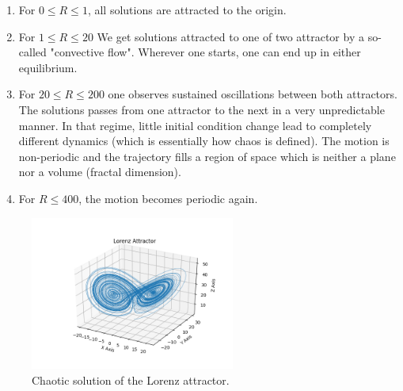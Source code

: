 \begin{enumerate}
    \item For $0\leq R \leq 1$, all solutions are attracted to the origin.
    \item For $1 \leq R \leq 20$ We get solutions attracted to one of two attractor by a so-called "convective flow". Wherever one starts, one can end up in either equilibrium. 
    \item For $20 \leq R \leq 200$ one observes sustained oscillations between both attractors. The solutions passes from one attractor to the next in a very unpredictable manner. In that regime, little initial condition change lead to completely different dynamics (which is essentially how chaos is defined). The motion is non-periodic and the trajectory fills a region of space which is neither a plane nor a volume (fractal dimension). 
    \item For $R \leq 400$, the motion becomes periodic again. 
\end{enumerate}

\begin{figure}[h!]
    \centering
    \includegraphics[width=0.6\textwidth]{figures/1_chaotic_lorenz.png}
    \caption{Chaotic solution of the Lorenz attractor.}
\end{figure}
